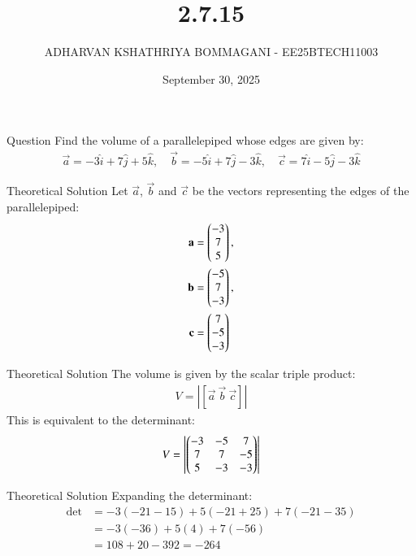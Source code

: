 \documentclass{beamer}
\title{2.7.15}
\date{September 30, 2025}
\author{ADHARVAN KSHATHRIYA BOMMAGANI - EE25BTECH11003}
\begin{document}
\frame{\titlepage}

\begin{frame}{Question}
Find the volume of a parallelepiped whose edges are given by:
\begin{align*}
\vec{a} = -3\hat{i} + 7\hat{j} + 5\hat{k}, \quad
\vec{b} = -5\hat{i} + 7\hat{j} - 3\hat{k}, \quad
\vec{c} = 7\hat{i} - 5\hat{j} - 3\hat{k}
\end{align*}
\end{frame}

\begin{frame}{Theoretical Solution}
Let $\vec{a}$, $\vec{b}$ and $\vec{c}$ be the vectors representing the edges of the parallelepiped:
\begin{align*}
\mathbf{a} &= \begin{pmatrix}-3 \\ 7 \\ 5\end{pmatrix}, \\
\mathbf{b} &= \begin{pmatrix}-5 \\ 7 \\ -3\end{pmatrix}, \\
\mathbf{c} &= \begin{pmatrix}7 \\ -5 \\ -3\end{pmatrix}
\end{align*}
\end{frame}

\begin{frame}{Theoretical Solution}
The volume is given by the scalar triple product:
\begin{align*}
V = \left| [\vec{a} \ \vec{b} \ \vec{c}] \right|
\end{align*}
This is equivalent to the determinant:
\begin{align*}
V = \left| \begin{pmatrix} -3 & -5 & 7 \\ 7 & 7 & -5 \\ 5 & -3 & -3 \end{pmatrix} \right|
\end{align*}
\end{frame}

\begin{frame}{Theoretical Solution}
Expanding the determinant:
\begin{align*}
\det 
&= -3(-21 - 15) + 5(-21 + 25) + 7(-21 - 35) \\
&= -3(-36) + 5(4) + 7(-56) \\
&= 108 + 20 - 392 = -264
\end{align*}
\end{frame}
\end{document}
